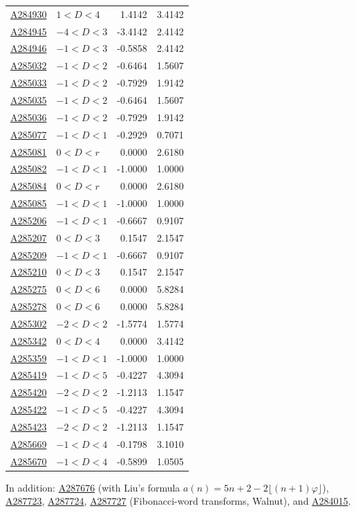 \documentclass[11pt]{article}
\newcommand{\oeis}[1]{\href{https://oeis.org/#1}{#1}}
\begin{document}
\begin{longtable}{llrr}
\oeis{A284930} & $1<D<4$ & 1.4142 & 3.4142 \\
\oeis{A284945} & $-4<D<3$ & -3.4142 & 2.4142 \\
\oeis{A284946} & $-1<D<3$ & -0.5858 & 2.4142 \\
\oeis{A285032} & $-1<D<2$ & -0.6464 & 1.5607 \\
\oeis{A285033} & $-1<D<2$ & -0.7929 & 1.9142 \\
\oeis{A285035} & $-1<D<2$ & -0.6464 & 1.5607 \\
\oeis{A285036} & $-1<D<2$ & -0.7929 & 1.9142 \\
\oeis{A285077} & $-1<D<1$ & -0.2929 & 0.7071 \\
\oeis{A285081} & $0<D<r$ & 0.0000 & 2.6180 \\
\oeis{A285082} & $-1<D<1$ & -1.0000 & 1.0000 \\
\oeis{A285084} & $0<D<r$ & 0.0000 & 2.6180 \\
\oeis{A285085} & $-1<D<1$ & -1.0000 & 1.0000 \\
\oeis{A285206} & $-1<D<1$ & -0.6667 & 0.9107 \\
\oeis{A285207} & $0<D<3$ & 0.1547 & 2.1547 \\
\oeis{A285209} & $-1<D<1$ & -0.6667 & 0.9107 \\
\oeis{A285210} & $0<D<3$ & 0.1547 & 2.1547 \\
\oeis{A285275} & $0<D<6$ & 0.0000 & 5.8284 \\
\oeis{A285278} & $0<D<6$ & 0.0000 & 5.8284 \\
\oeis{A285302} & $-2<D<2$ & -1.5774 & 1.5774 \\
\oeis{A285342} & $0<D<4$ & 0.0000 & 3.4142 \\
\oeis{A285359} & $-1<D<1$ & -1.0000 & 1.0000 \\
\oeis{A285419} & $-1<D<5$ & -0.4227 & 4.3094 \\
\oeis{A285420} & $-2<D<2$ & -1.2113 & 1.1547 \\
\oeis{A285422} & $-1<D<5$ & -0.4227 & 4.3094 \\
\oeis{A285423} & $-2<D<2$ & -1.2113 & 1.1547 \\
\oeis{A285669} & $-1<D<4$ & -0.1798 & 3.1010 \\
\oeis{A285670} & $-1<D<4$ & -0.5899 & 1.0505 \\
\bottomrule
\end{longtable}
In addition: \oeis{A287676} (with Liu's formula $a(n)=5n+2-2\lfloor (n+1)\varphi\rfloor$), \oeis{A287723},
\oeis{A287724}, \oeis{A287727} (Fibonacci-word transforms, Walnut), and \oeis{A284015}.
\end{document}

